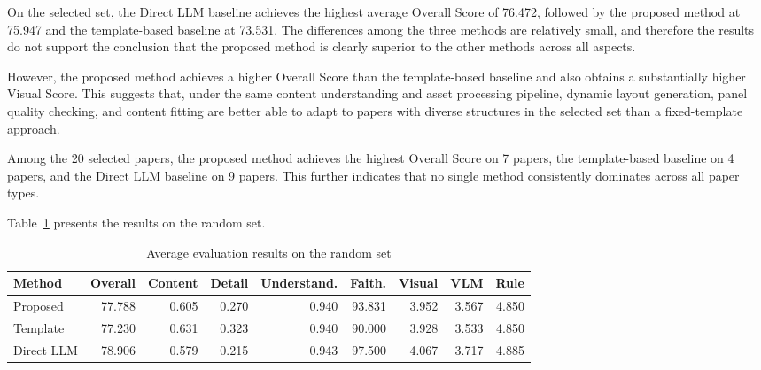 \documentclass[12pt,oneside]{report}
\begin{document}
\vspace{1em}

On the selected set, the Direct LLM baseline achieves the highest average Overall Score of 76.472, followed by the proposed method at 75.947 and the template-based baseline at 73.531. The differences among the three methods are relatively small, and therefore the results do not support the conclusion that the proposed method is clearly superior to the other methods across all aspects.

\vspace{1em}

However, the proposed method achieves a higher Overall Score than the template-based baseline and also obtains a substantially higher Visual Score. This suggests that, under the same content understanding and asset processing pipeline, dynamic layout generation, panel quality checking, and content fitting are better able to adapt to papers with diverse structures in the selected set than a fixed-template approach.

\vspace{1em}

Among the 20 selected papers, the proposed method achieves the highest Overall Score on 7 papers, the template-based baseline on 4 papers, and the Direct LLM baseline on 9 papers. This further indicates that no single method consistently dominates across all paper types.

\vspace{1em}

Table~\ref{tab:random_results} presents the results on the random set.

\begin{table}[H]
\centering
\small
\setlength{\tabcolsep}{4pt}
\renewcommand{\arraystretch}{1.2}
\caption{Average evaluation results on the random set}
\label{tab:random_results}

\begin{tabularx}{\textwidth}{lrrrrrrrr}
\toprule
\textbf{Method} &
\textbf{Overall} &
\textbf{Content} &
\textbf{Detail} &
\textbf{Understand.} &
\textbf{Faith.} &
\textbf{Visual} &
\textbf{VLM} &
\textbf{Rule} \\
\midrule
Proposed & 77.788 & 0.605 & 0.270 & 0.940 & 93.831 & 3.952 & 3.567 & 4.850 \\
Template & 77.230 & 0.631 & 0.323 & 0.940 & 90.000 & 3.928 & 3.533 & 4.850 \\
Direct LLM & 78.906 & 0.579 & 0.215 & 0.943 & 97.500 & 4.067 & 3.717 & 4.885 \\
\bottomrule
\end{tabularx}
\end{table}
\end{document}
